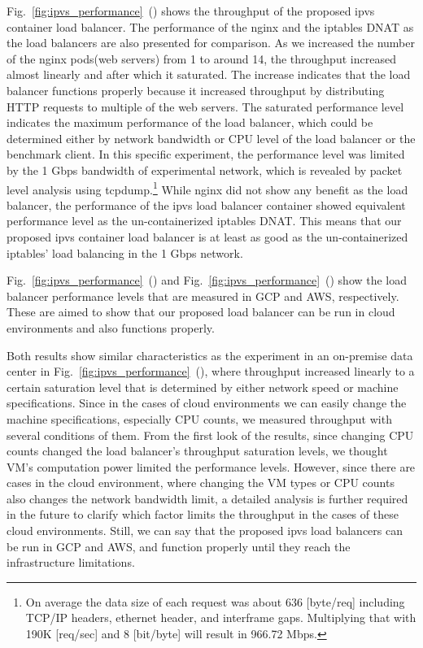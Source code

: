 Fig.~\ref{fig:ipvs_performance}~() shows the throughput of the proposed ipvs container load balancer.
The performance of the nginx and the iptables DNAT as the load balancers are also presented for comparison.
As we increased the number of the nginx pods(web servers) from 1 to around 14, the throughput increased almost linearly and after which it saturated.
The increase indicates that the load balancer functions properly because it increased throughput by distributing HTTP requests to multiple of the web servers.
The saturated performance level indicates the maximum performance of the load balancer, which could be determined either by network bandwidth or CPU level of the load balancer or the benchmark client.
In this specific experiment, the performance level was limited by the 1 Gbps bandwidth of experimental network\cite{takahashi2018portable}, which is revealed by packet level analysis using tcpdump.\footnote{
On average the data size of each request was about 636 [byte/req] including TCP/IP headers, ethernet header, and interframe gaps.
Multiplying that with 190K [req/sec] and 8 [bit/byte] will result in 966.72 Mbps.
}
While nginx did not show any benefit as the load balancer, the performance of the ipvs load balancer container showed equivalent performance level as the un-containerized iptables DNAT.
This means that our proposed ipvs container load balancer is at least as good as the un-containerized iptables' load balancing in the 1 Gbps network.

Fig.~\ref{fig:ipvs_performance}~() and Fig.~\ref{fig:ipvs_performance}~() show the load balancer performance levels that are measured in GCP and AWS, respectively.
These are aimed to show that our proposed load balancer can be run in cloud environments and also functions properly.

Both results show similar characteristics as the experiment in an on-premise data center in Fig.~\ref{fig:ipvs_performance}~(), where throughput increased linearly to a certain saturation level that is determined by either network speed or machine specifications.
Since in the cases of cloud environments we can easily change the machine specifications, especially CPU counts, we measured throughput with several conditions of them.
From the first look of the results, since changing CPU counts changed the load balancer's throughput saturation levels, we thought VM's computation power limited the performance levels.
However, since there are cases in the cloud environment, where changing the VM types or CPU counts also changes the network bandwidth limit, a detailed analysis is further required in the future to clarify which factor limits the throughput in the cases of these cloud environments.
Still, we can say that the proposed ipvs load balancers can be run in GCP and AWS, and function properly until they reach the infrastructure limitations.



